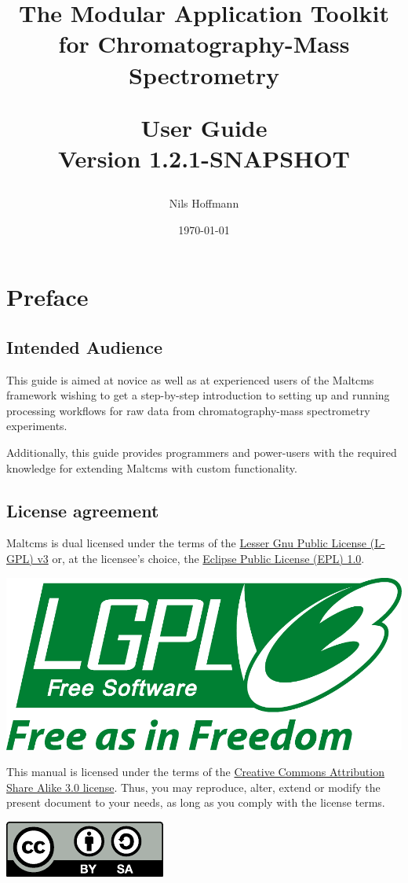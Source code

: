 \documentclass[10pt,a4paper,onecolumn,twoside,titlepage,headsepline,open=any]{scrbook}
\author{Nils Hoffmann}
\title{The Modular Application Toolkit for Chromatography-Mass Spectrometry\\\vspace{1ex}\begin{Large}
User Guide\\
Version 1.2.1-SNAPSHOT
\end{Large}}
\date{\today}
\begin{document}
\frontmatter    %
\maketitle       %
\chapter*{Preface}
\section*{Intended Audience}
This guide is aimed at novice as well as at experienced users of the Maltcms framework wishing to get a step-by-step introduction
to setting up and running processing workflows for raw data from chromatography-mass spectrometry experiments. 

Additionally, this guide provides programmers and power-users with the required knowledge for extending Maltcms with custom functionality. 
\section*{License agreement}
Maltcms is dual licensed under the terms of the \href{http://www.gnu.org/licenses/lgpl.html}{Lesser Gnu Public License (L-GPL) v3} or, 
at the licensee's choice, the \href{http://www.eclipse.org/legal/epl-v10.html}{Eclipse Public License (EPL) 1.0}.

\begin{flushleft}
\includegraphics[scale=0.2]{../resources/images/lgpl-v3.pdf} 
\end{flushleft}

\noindent This manual is licensed under the terms of the \href{http://creativecommons.org/licenses/by-sa/3.0/deed.en}{Creative Commons Attribution Share Alike 3.0 license}. Thus, you may reproduce, alter, extend or modify the present document to your needs, as long as you comply with the license terms. 
\begin{flushleft}
\includegraphics[scale=1]{../resources/images/by-sa.pdf} 
\end{flushleft}
\end{document}
